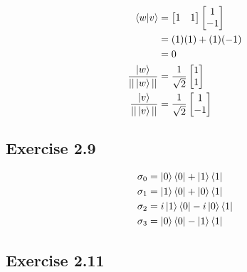 \documentclass{article}
\begin{document}
\begin{align*}
  \braket{w | v}              & = \begin{bmatrix}
                                    1 & 1
                                  \end{bmatrix} \begin{bmatrix}
                                                  1 \\
                                                  -1
                                                \end{bmatrix}      \\
                              & = (1) (1) + (1) (-1)                \\
                              & = 0                                 \\
  \frac{\ket{w}}{||\ket{w}||} & = \frac{1}{\sqrt{2}} \begin{bmatrix}
                                                       1 \\
                                                       1
                                                     \end{bmatrix} \\
  \frac{\ket{v}}{||\ket{v}||} & = \frac{1}{\sqrt{2}} \begin{bmatrix}
                                                       1 \\
                                                       -1
                                                     \end{bmatrix}
\end{align*}

\subsection*{Exercise 2.9}

\begin{align*}
  \sigma_0 & = \ket{0} \bra{0} + \ket{1} \bra{1}     \\
  \sigma_1 & = \ket{1} \bra{0} + \ket{0} \bra{1}     \\
  \sigma_2 & = i \ket{1} \bra{0} - i \ket{0} \bra{1} \\
  \sigma_3 & = \ket{0} \bra{0} - \ket{1} \bra{1}
\end{align*}

\subsection*{Exercise 2.11}
\end{document}

